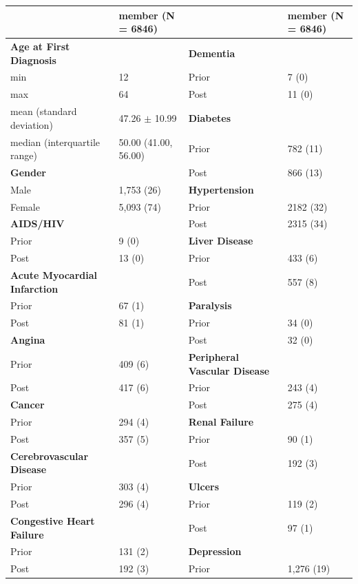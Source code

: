 \documentclass[10pt]{article}
\begin{document}
\begin{table}[H]
	\begin{tabular}{l|l|l|l}
		\hline
		~ & member (N = 6846) & ~ & member (N = 6846)\\
		\hline
		\bf{Age at First Diagnosis} & ~ & \bf{Dementia} & ~\\
		\hline
		min & 12 & Prior & 7 (0)\\
		\hline
		max & 64 & Post & 11 (0)\\
		\hline
		mean (standard deviation) & 47.26 $\pm$ 10.99 & \bf{Diabetes} & ~\\
		\hline
		median (interquartile range) & 50.00 (41.00, 56.00) & Prior & 782 (11)\\
		\hline
		\bf{Gender} & ~ & Post & 866 (13)\\
		\hline
		Male & 1,753 (26) & \bf{Hypertension} & ~\\
		\hline
		Female & 5,093 (74) & Prior & 2182 (32) \\
		\hline
		\bf{AIDS/HIV} & ~ & Post & 2315 (34)\\
		\hline
		Prior & 9 (0) & \bf{Liver Disease} & ~\\
		\hline
		Post & 13 (0) & Prior & 433 (6)\\
		\hline
		\bf{Acute Myocardial Infarction} & ~ & Post & 557 (8)\\
		\hline
		Prior & 67 (1) & \bf{Paralysis} & ~\\
		\hline
		Post & 81 (1) & Prior & 34 (0)\\
		\hline
		\bf{Angina} & ~ & Post & 32 (0)\\
		\hline
		Prior & 409 (6) & \bf{Peripheral Vascular Disease} & ~\\
		\hline
		Post & 417 (6) & Prior & 243 (4)\\
		\hline
		\bf{Cancer} & ~ & Post & 275 (4)\\
		\hline
		Prior & 294 (4) & \bf{Renal Failure} & ~\\
		\hline
		Post & 357 (5) & Prior & 90 (1)\\
		\hline
		\bf{Cerebrovascular Disease} & ~ & Post & 192 (3)\\
		\hline
		Prior & 303 (4) & \bf{Ulcers} & ~\\
		\hline
		Post & 296 (4) & Prior & 119 (2)\\
		\hline
		\bf{Congestive Heart Failure} & ~ & Post & 97 (1)\\
		\hline
		Prior & 131 (2) & \bf{Depression} & ~\\
		\hline
		Post & 192 (3) & Prior & 1,276 (19)\\

\end{tabular}
\end{table}
\end{document}
